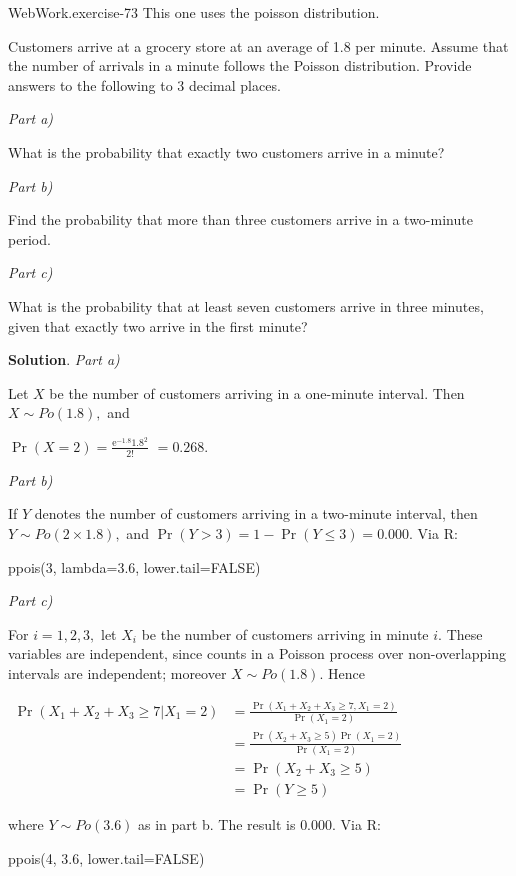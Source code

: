 \documentclass[10pt,]{book}
\numberwithin{equation}{section}
\newcommand{\amp}{&}
\begin{document}
%
\par
\hypertarget{p-1037}{}%
\begin{inlineexercise}{WebWork.}{exercise-73}%
\hypertarget{p-1038}{}%
This one uses the poisson distribution.%
\par\medskip
\hypertarget{p-1039}{}%
Customers arrive at a grocery store at an average of 1.8 per minute. Assume that the number of arrivals in a minute follows the Poisson distribution. Provide answers to the following to 3 decimal places.%
\par
\hypertarget{p-1040}{}%
\emph{Part a)}%
\par
\hypertarget{p-1041}{}%
What is the probability that exactly two customers arrive in a minute?%
\par
\hypertarget{p-1043}{}%
\emph{Part b)}%
\par
\hypertarget{p-1044}{}%
Find the probability that more than three customers arrive in a two-minute period.%
\par
\hypertarget{p-1046}{}%
\emph{Part c)}%
\par
\hypertarget{p-1047}{}%
What is the probability that at least seven customers arrive in three minutes, given that exactly two arrive in the first minute?%
\par\smallskip%
\noindent\textbf{Solution}.\hypertarget{solution-33}{}\quad%
\hypertarget{p-1049}{}%
\emph{Part a)}%
\par
\hypertarget{p-1050}{}%
Let \(X\) be the number of customers arriving in a one-minute interval. Then \(X \sim Po(1.8),\) and%
\par
\hypertarget{p-1051}{}%
\(\Pr(X = 2) = \frac{\text{e}^{-1.8} 1.8^2}{2!}\) \(= 0.268.\)%
\par
\hypertarget{p-1052}{}%
\emph{Part b)}%
\par
\hypertarget{p-1053}{}%
If \(Y\) denotes the number of customers arriving in a two-minute interval, then \(Y \sim Po(2 \times 1.8),\) and \(\Pr(Y > 3) = 1 - \Pr(Y \leq 3) = 0.000.\) Via R:%
\par
\hypertarget{p-1054}{}%
ppois(3, lambda=3.6, lower.tail=FALSE)%
\par
\hypertarget{p-1055}{}%
\emph{Part c)}%
\par
\hypertarget{p-1056}{}%
For \(i = 1, 2, 3,\) let \(X_i\) be the number of customers arriving in minute \(i\). These variables are independent, since counts in a Poisson process over non-overlapping intervals are independent; moreover \(X \sim Po(1.8).\) Hence%
\par
\hypertarget{p-1057}{}%
\(\begin{align*} \Pr(X_1 + X_2 + X_3 \geq 7 | X_1 = 2) \amp = \frac{\Pr(X_1 + X_2 + X_3 \geq 7, X_1 = 2)}{\Pr(X_1 = 2)} \\ \amp = \frac{\Pr(X_2 + X_3 \geq 5) \Pr(X_1 = 2)}{\Pr(X_1 = 2)} \\ \amp = \Pr(X_2 + X_3 \geq 5) \\ \amp = \Pr(Y \geq 5) \end{align*}\)%
\par
\hypertarget{p-1058}{}%
where \(Y \sim Po(3.6)\) as in part b. The result is \(0.000.\) Via R:%
\par
\hypertarget{p-1059}{}%
ppois(4, 3.6, lower.tail=FALSE)%
\end{inlineexercise}
\end{document}
